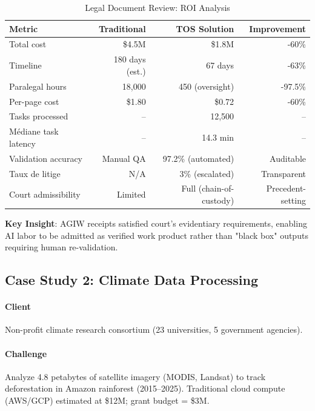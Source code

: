 \documentclass[11pt]{article}
\begin{document}
\begin{table}[H]
\centering
\caption{Legal Document Review: ROI Analysis}
\label{tab:legal-roi}
\begin{tabular}{@{}lrrr@{}}
\toprule
\textbf{Metric} & \textbf{Traditional} & \textbf{TOS Solution} & \textbf{Improvement} \\ \midrule
Total cost & \$4.5M & \$1.8M & -60\% \\
Timeline & 180 days (est.) & 67 days & -63\% \\
Paralegal hours & 18,000 & 450 (oversight) & -97.5\% \\
Per-page cost & \$1.80 & \$0.72 & -60\% \\
Tasks processed & -- & 12,500 & -- \\
Médiane task latency & -- & 14.3 min & -- \\
Validation accuracy & Manual QA & 97.2\% (automated) & Auditable \\
Taux de litige & N/A & 3\% (escalated) & Transparent \\
Court admissibility & Limited & Full (chain-of-custody) & Precedent-setting \\
\bottomrule
\end{tabular}
\end{table}

\textbf{Key Insight}: AGIW receipts satisfied court's evidentiary requirements, enabling AI labor to be admitted as verified work product rather than "black box" outputs requiring human re-validation.

\subsection{Case Study 2: Climate Data Processing}

\paragraph{Client} Non-profit climate research consortium (23 universities, 5 government agencies).

\paragraph{Challenge} Analyze 4.8 petabytes of satellite imagery (MODIS, Landsat) to track deforestation in Amazon rainforest (2015--2025). Traditional cloud compute (AWS/GCP) estimated at \$12M; grant budget = \$3M.
\end{document}
